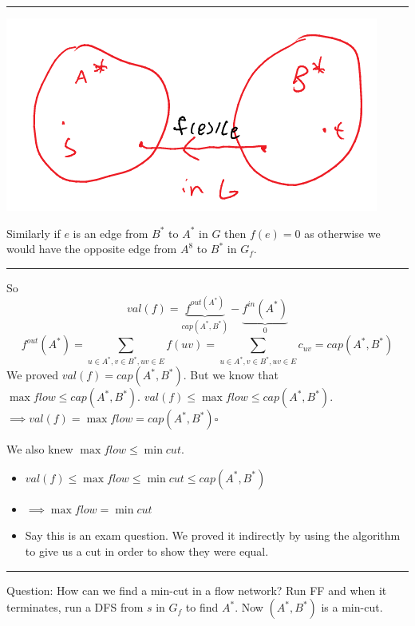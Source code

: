 \documentclass[11pt]{article}
\begin{document}
\noindent\rule{\textwidth}{0.5pt}
\begin{center}
\includegraphics[width=.9\linewidth]{./Images/i122.png}
\end{center}
Similarly if \(e\) is an edge from \(B^*\) to \(A^*\) in \(G\) then \(f(e)=0\) as otherwise we would have the opposite edge from \(A^8\) to \(B^*\) in \(G_f\).

\noindent\rule{\textwidth}{0.5pt}
So $$val(f) = \underbrace{f^{out(A^*)}}_{cap(A^*,B^*)}-\underbrace{f^{in}(A^*)}_{0}$$
$$f^{out}(A^*)=\sum_{u \in A^*, v\in B^*, uv \in E}f(uv) = \sum_{u \in A^*, v \in B^*, uv\in E}c_{uv}=cap(A^*,B^*)$$
We proved \(val(f) = cap(A^*,B^*)\). But we know that \(\max flow \leq cap(A^*, B^*)\). \(val(f) \leq \max flow \leq cap(A^*, B^*)\). \(\implies val(f) = \max flow = cap(A^*,B^*) \square\)

We also knew \(\max flow \leq \min cut\). 
\begin{itemize}
\item \(val(f) \leq \max flow \leq \min cut \leq cap(A^*,B^*)\)
\item \(\implies \max flow = \min cut\)
\item Say this is an exam question. We proved it indirectly by using the algorithm to give us a cut in order to show they were equal.
\end{itemize}

\noindent\rule{\textwidth}{0.5pt}
Question: How can we find a min-cut in a flow network? Run FF and when it terminates, run a DFS from \(s\) in \(G_f\) to find \(A^*\). Now \((A^*, B^*)\) is a min-cut.
\end{document}
